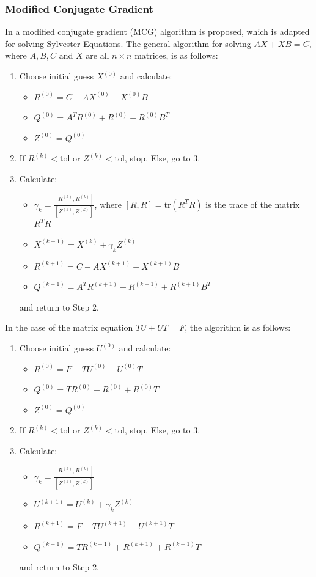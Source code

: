 \documentclass[11pt]{article}
\numberwithin{equation}{section}
\begin{document}
\subsubsection{Modified Conjugate Gradient}
In \cite{Hou} a modified conjugate gradient (MCG) algorithm is proposed, which is adapted for solving Sylvester Equations. The general algorithm for solving $AX+XB=C$, where $A, B, C$ and $X$ are all $n \times n$ matrices, is as follows:
\begin{enumerate}
\item Choose initial guess $X^{(0)}$ and calculate:
	\begin{itemize}
	\item $R^{(0)} = C - AX^{(0)} - X^{(0)}B$
	\item $Q^{(0)} = A^T R^{(0)} + R^{(0)} + R^{(0)} B^T$
	\item $Z^{(0)} = Q^{(0)}$
	\end{itemize}
\item If $R^{(k)} < \text{tol}$ or $Z^{(k)} < \text{tol}$, stop. Else, go to 3.
\item Calculate:
	\begin{itemize}
	\item $\gamma_k = \frac{[R^{(k)}, R^{(k)}]}{[Z^{(k)}, Z^{(k)}]}$, where $[R,R] = \text{tr}(R^T R)$ is the trace of the matrix $R^T R$
	\item $X^{(k+1)} = X^{(k)} + \gamma_k Z^{(k)}$
	\item $R^{(k+1)} = C - AX^{(k+1)} - X^{(k+1)} B$
	\item $Q^{(k+1)} = A^T R^{(k+1)} + R^{(k+1)} + R^{(k+1)} B^T$
	\end{itemize}
	and return to Step 2.
\end{enumerate}

In the case of the matrix equation $TU+UT=F$, the algorithm is as follows:
\begin{enumerate}
\item Choose initial guess $U^{(0)}$ and calculate:
	\begin{itemize}
	\item $R^{(0)} = F - TU^{(0)} - U^{(0)}T$
	\item $Q^{(0)} = T R^{(0)} + R^{(0)} + R^{(0)} T$
	\item $Z^{(0)} = Q^{(0)}$
	\end{itemize}
\item If $R^{(k)} < \text{tol}$ or $Z^{(k)} < \text{tol}$, stop. Else, go to 3.
\item Calculate:
	\begin{itemize}
	\item $\gamma_k = \frac{[R^{(k)}, R^{(k)}]}{[Z^{(k)}, Z^{(k)}]}$
	\item $U^{(k+1)} = U^{(k)} + \gamma_k Z^{(k)}$
	\item $R^{(k+1)} = F - TU^{(k+1)} - U^{(k+1)} T$
	\item $Q^{(k+1)} = T R^{(k+1)} + R^{(k+1)} + R^{(k+1)} T$
	\end{itemize}
	and return to Step 2.
\end{enumerate}
\end{document}
